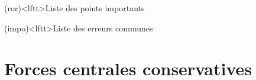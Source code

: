 \documentclass[../../main/main.tex]{subfiles}
\begin{document}
\begin{boxes}
	\begin{tcb}(ror)<lftt>{Liste des points importants}
	\end{tcb}
	\begin{tcb}(impo)<lftt>{Liste des erreurs communes}
	\end{tcb}
\end{boxes}
\vspace*{\fill}
\newpage

\section{Forces centrales conservatives}
\end{document}
